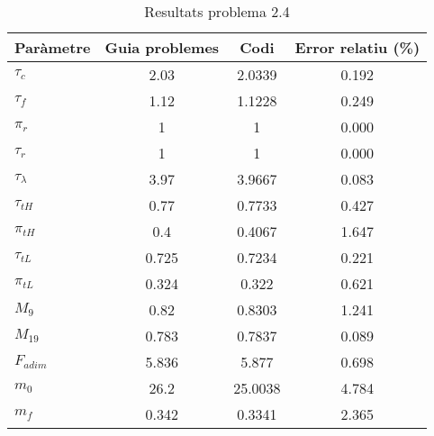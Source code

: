 \begin{table}[H]
\centering
\begin{tabular}{lccc}
\toprule[3pt]
\textbf{Paràmetre} &\textbf{ Guia problemes} &\textbf{ Codi}    & \textbf{Error relatiu (\%)} \\
\midrule[1pt]
$\tau_c$     & 2.03           & 2.0339  & 0.192              \\
$\tau_f$    & 1.12           & 1.1228  & 0.249              \\
$\pi_r$  & 1              & 1       & 0.000              \\
$\tau_r$     & 1              & 1       & 0.000              \\
$\tau_\lambda$  & 3.97           & 3.9667  & 0.083              \\
$\tau_{tH}$  & 0.77           & 0.7733  & 0.427              \\
$\pi_{tH}$    & 0.4            & 0.4067  & 1.647              \\
$\tau_{tL}$     & 0.725          & 0.7234  & 0.221              \\
$\pi_{tL}$    & 0.324          & 0.322   & 0.621              \\
$M_9$        & 0.82           & 0.8303  & 1.241              \\
$M_{19}$       & 0.783          & 0.7837  & 0.089              \\
$F_{adim}$     & 5.836          & 5.877   & 0.698              \\
$m_0$    & 26.2           & 25.0038 & 4.784              \\
$m_f$        & 0.342          & 0.3341  & 2.365        \\
     \bottomrule[2pt]
\end{tabular}
\caption{Resultats problema 2.4}
\end{table}
